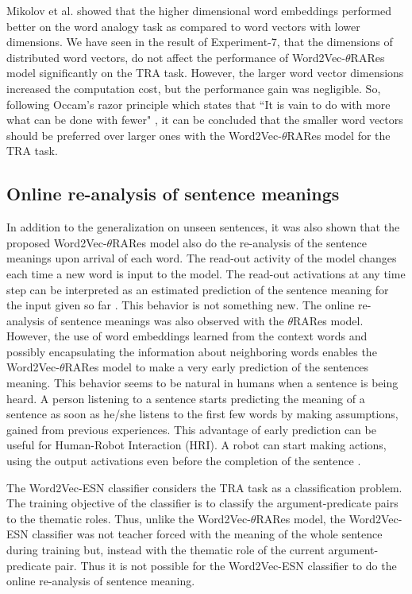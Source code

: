 Mikolov et al. \cite{w2v:mikolov_2013_efficient,w2v:mikolov_2013_distributed} showed that the higher dimensional word embeddings performed better on the word analogy task as compared to word vectors with lower dimensions. We have seen in the result of Experiment-7, that the dimensions of distributed word vectors,  do not affect the performance of Word2Vec-$\theta$RARes model significantly on the TRA task. However, the larger word vector dimensions increased the computation cost, but the performance gain was negligible. So, following Occam's razor principle which states that ``It is vain to do with more what can be done with fewer" \cite{razor:franklin_2002}, it can be concluded that the smaller word vectors should be preferred over larger ones with the Word2Vec-$\theta$RARes model for the TRA task.

\subsection{Online re-analysis of sentence meanings}

In addition to the generalization on unseen sentences, it was also shown that the proposed Word2Vec-$\theta$RARes model also do the re-analysis of the sentence meanings upon arrival of each word. The read-out activity of the model changes each time a new word is input to the model. The read-out activations at any time step can be interpreted as an estimated prediction of the sentence meaning for the input given so far \cite{xavier:2013:RT}. This behavior is not something new. The online re-analysis of sentence meanings was also observed with the $\theta$RARes model. However, the use of word embeddings learned from the context words and possibly encapsulating the information about neighboring words enables the Word2Vec-$\theta$RARes model to make a very early prediction of the sentences meaning. This behavior seems to be natural in humans when a sentence is being heard. A person listening to a sentence starts predicting the meaning of a sentence as soon as he/she listens to the first few words by making assumptions, gained from previous experiences. This advantage of early prediction can be useful for Human-Robot Interaction (HRI). A robot can start making actions, using the output activations even before the completion of the sentence \cite{tra:xavier_hri}.

The Word2Vec-ESN classifier considers the TRA task as a classification problem. The training objective of the classifier is to classify the argument-predicate pairs to the thematic roles. Thus, unlike the Word2Vec-$\theta$RARes model, the Word2Vec-ESN classifier was not teacher forced with the meaning of the whole sentence during training but, instead with the thematic role of the current argument-predicate pair. Thus it is not possible for the Word2Vec-ESN classifier to do the online re-analysis of sentence meaning.

